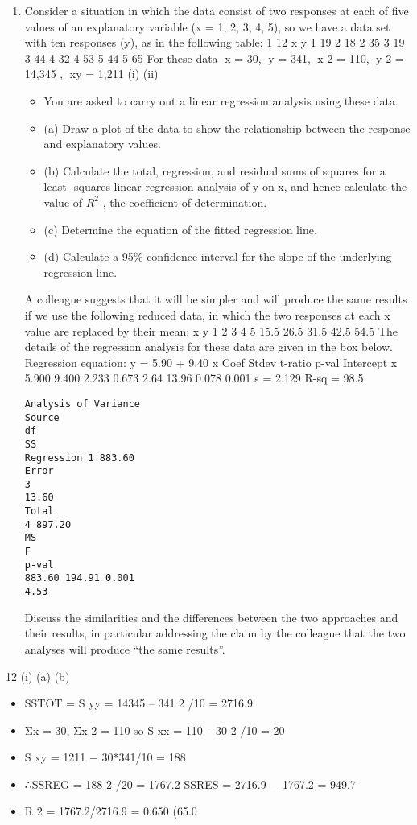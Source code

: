 \documentclass[a4paper,12pt]{article}
\begin{document}
\begin{enumerate}

\item Consider a situation in which the data consist of two responses at each of five values
of an explanatory variable (x = 1, 2, 3, 4, 5), so we have a data set with ten responses
(y), as in the following table:
1
12
x
y
1
19
2
18
2
35
3
19
3
44
4
32
4
53
5
44
5
65
For these data x = 30, y = 341, x 2 = 110, y 2 = 14,345 , xy = 1,211
(i)
(ii)
\begin{itemize}
\item You are asked to carry out a linear regression analysis using these data.
\item (a) Draw a plot of the data to show the relationship between the response and explanatory values.
\item (b) Calculate the total, regression, and residual sums of squares for a least- squares linear regression analysis of y on x, and hence calculate the value of $R^2$ , the coefficient of determination.
\item (c) Determine the equation of the fitted regression line.
\item (d) Calculate a 95\% confidence interval for the slope of the underlying regression line.
\end{itemize}
A colleague suggests that it will be simpler and will produce the same results if we use the following reduced data, in which the two responses at each x
value are replaced by their mean:
x
y
1
2
3
4
5
15.5 26.5 31.5 42.5 54.5
The details of the regression analysis for these data are given in the box below.
Regression equation: y = 5.90 + 9.40 x
Coef Stdev t-ratio p-val
Intercept
x 5.900
9.400 2.233
0.673 2.64
13.96 0.078
0.001
s = 2.129 R-sq = 98.5%
\begin{verbatim}
Analysis of Variance
Source
df
SS
Regression 1 883.60
Error
3
13.60
Total
4 897.20
MS
F
p-val
883.60 194.91 0.001
4.53
\end{verbatim}
Discuss the similarities and the differences between the two approaches and their
results, in particular addressing the claim by the colleague that the two analyses will
produce “the same results”.

\end{enumerate}
\newpage
12
(i)
(a)
(b)
\begin{itemize}
\item SSTOT = S yy = 14345 – 341 2 /10 = 2716.9
\item Σx = 30, Σx 2 = 110 so S xx = 110 – 30 2 /10 = 20
\item S xy = 1211 − 30*341/10 = 188
\item ∴SSREG = 188 2 /20 = 1767.2
SSRES = 2716.9 − 1767.2 = 949.7
\item R 2 = 1767.2/2716.9 = 0.650 (65.0%
\end{itemize}
\end{document}
